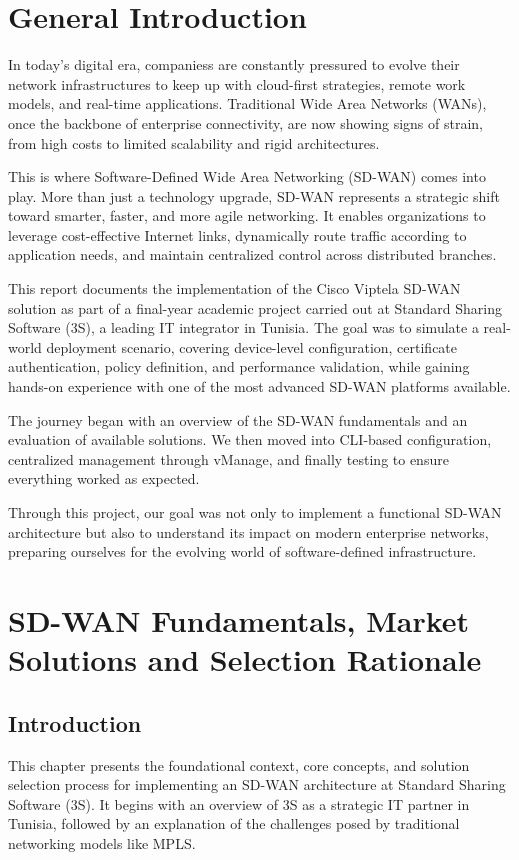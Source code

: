 \documentclass[12pt,english]{report}
\begin{document}
\chapter*{General Introduction}
In today's digital era, companiess are constantly pressured to evolve their network infrastructures to keep up with cloud-first strategies, remote work models, and real-time applications. Traditional Wide Area Networks (WANs), once the backbone of enterprise connectivity, are now showing signs of strain, from high costs to limited scalability and rigid architectures.

This is where Software-Defined Wide Area Networking (SD-WAN) comes into play. More than just a technology upgrade, SD-WAN represents a strategic shift toward smarter, faster, and more agile networking. It enables organizations to leverage cost-effective Internet links, dynamically route traffic according to application needs, and maintain centralized control across distributed branches.

This report documents the implementation of the Cisco Viptela SD-WAN solution as part of a final-year academic project carried out at Standard Sharing Software (3S), a leading IT integrator in Tunisia. The goal was to simulate a real-world deployment scenario, covering device-level configuration, certificate authentication, policy definition, and performance validation, while gaining hands-on experience with one of the most advanced SD-WAN platforms available.

The journey began with an overview of the SD-WAN fundamentals and an evaluation of available solutions. We then moved into CLI-based configuration, centralized management through vManage, and finally testing to ensure everything worked as expected.

Through this project, our goal was not only to implement a functional SD-WAN architecture but also to understand its impact on modern enterprise networks, preparing ourselves for the evolving world of software-defined infrastructure.

\chapter{SD-WAN Fundamentals, Market Solutions and Selection Rationale}
\section{Introduction}
This chapter presents the foundational context, core concepts, and solution selection process for implementing an SD-WAN architecture at Standard Sharing Software (3S). It begins with an overview of 3S as a strategic IT partner in Tunisia, followed by an explanation of the challenges posed by traditional networking models like MPLS.
\end{document}
